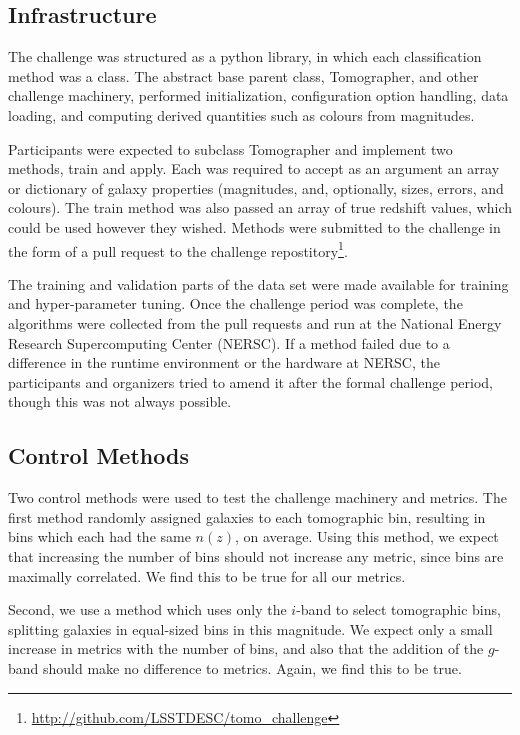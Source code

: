\documentclass[twocolumn,twocolappendix]{aastex63}
\begin{document}
\subsection{Infrastructure}

The challenge was structured as a python library, in which each classification
method was a class.  The abstract base parent class, {\sc Tomographer}, 
and other challenge machinery, performed initialization,
configuration option handling, data loading, and computing derived quantities
such as colours from magnitudes.

Participants were expected to subclass
{\sc Tomographer} and implement two methods, {\sc train} and {\sc apply}.  Each
was required to accept as an argument an array or dictionary of galaxy properties
(magnitudes, and, optionally, sizes, errors, and colours).  The {\sc train} method
was also passed an array of true redshift values, which could be used however they wished.
Methods were submitted to the challenge in the form of a pull request to the challenge
repostitory\footnote{\url{http://github.com/LSSTDESC/tomo_challenge}}.

The training and validation parts of the data set were made available for training
and hyper-parameter tuning. Once the challenge period was complete, the algorithms
were collected from the pull requests and run at the National Energy Research
Supercomputing Center (NERSC). If a method failed due to a difference in the
runtime environment or the hardware at NERSC, the participants and organizers tried
to amend it after the formal challenge period, though this was not always possible.



\subsection{Control Methods}

Two control methods were used to test the challenge machinery and metrics.
The first method randomly assigned galaxies to each tomographic bin, resulting
in bins which each had the same $n(z)$, on average.  Using this method, we expect
that increasing the number of bins should not increase any metric, since bins are
maximally correlated.  We find this to be true for all our metrics.

Second, we use a method which uses only the $i$-band to select tomographic bins,
splitting galaxies in equal-sized bins in this magnitude. We expect only a small
increase in metrics with the number of bins, and also that the addition of the $g$-band
should make no difference to metrics.  Again, we find this to be true.
\end{document}
